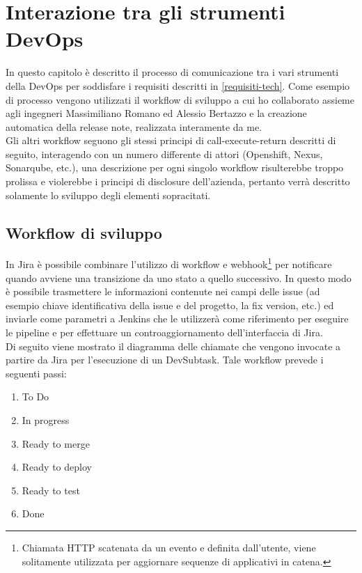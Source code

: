 \documentclass[a4paper, 12pt]{report}
\numberwithin{equation}{section}
\begin{document}
\chapter{Interazione tra gli strumenti DevOps}\label{tech}
In questo capitolo è descritto il processo di comunicazione tra i vari strumenti della DevOps per soddisfare i requisiti descritti in \ref{requisiti-tech}. Come esempio di processo vengono utilizzati il workflow di sviluppo a cui ho collaborato assieme agli ingegneri Massimiliano Romano ed Alessio Bertazzo e la creazione automatica della release note, realizzata interamente da me.\\
Gli altri workflow seguono gli stessi principi di call-execute-return descritti di seguito, interagendo con un numero differente di attori (Openshift, Nexus, Sonarqube, etc.), una descrizione per ogni singolo workflow risulterebbe troppo prolissa e violerebbe i principi di disclosure dell'azienda, pertanto verrà descritto solamente lo sviluppo degli elementi sopracitati.\\

\section{Workflow di sviluppo}
In Jira è possibile combinare l'utilizzo di workflow e webhook\footnote{Chiamata HTTP scatenata da un evento e definita dall'utente, viene solitamente utilizzata per aggiornare sequenze di applicativi in catena.} per notificare quando avviene una transizione da uno stato a quello successivo. In questo modo è possibile trasmettere le informazioni contenute nei campi delle issue (ad esempio chiave identificativa della issue e del progetto, la fix version, etc.) ed inviarle come parametri a Jenkins che le utilizzerà come riferimento per eseguire le pipeline e  per effettuare un controaggiornamento dell'interfaccia di Jira. \\
Di seguito viene mostrato il diagramma  delle chiamate che vengono invocate a partire da Jira per l'esecuzione di un DevSubtask. Tale workflow prevede i seguenti passi:
\begin{enumerate}
    \item To Do
    \item In progress
    \item Ready to merge
    \item Ready to deploy
    \item Ready to test
    \item Done
\end{enumerate}
\end{document}

